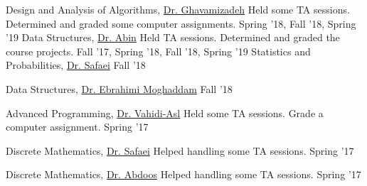 



\begin{cvtas}

  \cvta
    {Design and Analysis of Algorithms, \href{http://en.sbu.ac.ir/Pages/Profiles.aspx?proffID=375537}{Dr. Ghavamizadeh}} %
    {Held some TA sessions. Determined and graded some computer assignments.} %
    {Spring '18, Fall '18, Spring '19} %
    {} %
  \cvta
    {Data Structures, \href{http://facultymembers.sbu.ac.ir/abin/}{Dr. Abin}} %
    {Held TA sessions. Determined and graded the course projects.} %
    {Fall '17, Spring '18, Fall '18, Spring '19} %
    {} %
  \cvta
    {Statistics and Probabilities, \href{http://facultymembers.sbu.ac.ir/safaei/}{Dr. Safaei}} %
    {} %
    {Fall '18} %
    {} %

  \cvta
    {Data Structures, \href{http://facultymembers.sbu.ac.ir/moghaddam/}{Dr. Ebrahimi Moghaddam}} %
    {} %
    {Fall '18} %
    {} %

  \cvta
    {Advanced Programming, \href{http://facultymembers.sbu.ac.ir/vahidi/}{Dr. Vahidi-Asl}} %
    {Held some TA sessions. Grade a computer assignment.} %
    {Spring '17} %
    {} %

  \cvta
    {Discrete Mathematics, \href{http://facultymembers.sbu.ac.ir/safaei/}{Dr. Safaei}} %
    {Helped handling some TA sessions.} %
    {Spring '17} %
    {} %

  \cvta
    {Discrete Mathematics, \href{http://facultymembers.sbu.ac.ir/abdoos/}{Dr. Abdoos}} %
    {Helped handling some TA sessions.} %
    {Spring '17} %
    {} %


\end{cvtas}
